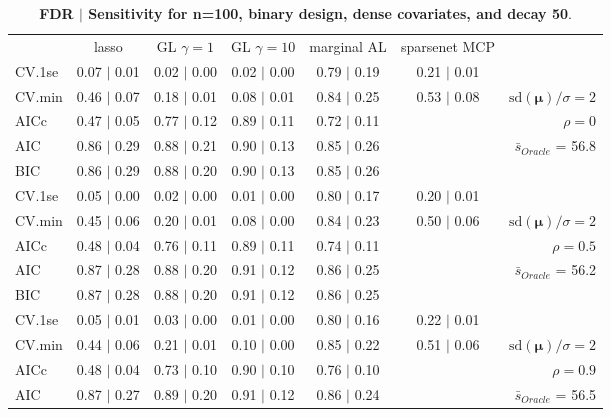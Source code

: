\begin{table}\vspace{-.5cm}
\caption[l]{ {\it }
{ \bf FDR $\boldsymbol{\mid}$ Sensitivity for n=100, binary design, dense covariates, and  decay  50}.}
\vspace{-.5cm}
\footnotesize{}
\begin{center}
\begin{tabular}{l*{5}{c}|r}
 & lasso & GL $\gamma=1$ & GL $\gamma=10$ & marginal AL & sparsenet MCP  & \\
 \cline{1-7}
CV.1se & 0.07 $\mid$ 0.01 & 0.02 $\mid$ 0.00 & 0.02 $\mid$ 0.00 & 0.79 $\mid$ 0.19 & 0.21 $\mid$ 0.01 & \\
CV.min & 0.46 $\mid$ 0.07 & 0.18 $\mid$ 0.01 & 0.08 $\mid$ 0.01 & 0.84 $\mid$ 0.25 & 0.53 $\mid$ 0.08 &  $\mathrm{sd}(\mathbf{\mu})/\sigma=2$ \\
AICc & 0.47 $\mid$ 0.05 & 0.77 $\mid$ 0.12 & 0.89 $\mid$ 0.11 & 0.72 $\mid$ 0.11 & & $\rho=0$ \\
AIC & 0.86 $\mid$ 0.29 & 0.88 $\mid$ 0.21 & 0.90 $\mid$ 0.13 & 0.85 $\mid$ 0.26 & &  \multirow{2}{*}{$\bar{s}_{Oracle}$ = 56.8} \\
BIC & 0.86 $\mid$ 0.29 & 0.88 $\mid$ 0.20 & 0.90 $\mid$ 0.13 & 0.85 $\mid$ 0.26 & &  \\
 \hline 
CV.1se & 0.05 $\mid$ 0.00 & 0.02 $\mid$ 0.00 & 0.01 $\mid$ 0.00 & 0.80 $\mid$ 0.17 & 0.20 $\mid$ 0.01 & \\
CV.min & 0.45 $\mid$ 0.06 & 0.20 $\mid$ 0.01 & 0.08 $\mid$ 0.00 & 0.84 $\mid$ 0.23 & 0.50 $\mid$ 0.06 &  $\mathrm{sd}(\mathbf{\mu})/\sigma=2$ \\
AICc & 0.48 $\mid$ 0.04 & 0.76 $\mid$ 0.11 & 0.89 $\mid$ 0.11 & 0.74 $\mid$ 0.11 & & $\rho=0.5$ \\
AIC & 0.87 $\mid$ 0.28 & 0.88 $\mid$ 0.20 & 0.91 $\mid$ 0.12 & 0.86 $\mid$ 0.25 & &  \multirow{2}{*}{$\bar{s}_{Oracle}$ = 56.2} \\
BIC & 0.87 $\mid$ 0.28 & 0.88 $\mid$ 0.20 & 0.91 $\mid$ 0.12 & 0.86 $\mid$ 0.25 & &  \\
 \hline 
CV.1se & 0.05 $\mid$ 0.01 & 0.03 $\mid$ 0.00 & 0.01 $\mid$ 0.00 & 0.80 $\mid$ 0.16 & 0.22 $\mid$ 0.01 & \\
CV.min & 0.44 $\mid$ 0.06 & 0.21 $\mid$ 0.01 & 0.10 $\mid$ 0.00 & 0.85 $\mid$ 0.22 & 0.51 $\mid$ 0.06 &  $\mathrm{sd}(\mathbf{\mu})/\sigma=2$ \\
AICc & 0.48 $\mid$ 0.04 & 0.73 $\mid$ 0.10 & 0.90 $\mid$ 0.10 & 0.76 $\mid$ 0.10 & & $\rho=0.9$ \\
AIC & 0.87 $\mid$ 0.27 & 0.89 $\mid$ 0.20 & 0.91 $\mid$ 0.12 & 0.86 $\mid$ 0.24 & &  \multirow{2}{*}{$\bar{s}_{Oracle}$ = 56.5} \\

\end{tabular}
\end{center}
\end{table}
